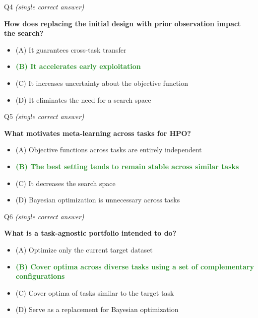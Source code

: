 \documentclass[main]{subfiles}
\newcommand{\correct}[1]{\textcolor{ForestGreen}{\textbf{#1} \checkmark}}
\newcommand{\wrong}[1]{#1}
\begin{document}
\begin{frame}{Q4 \hfill \small\normalfont\textit{(single correct answer)}}

\textbf{How does replacing the initial design with prior observation impact the search?}

\begin{itemize}
    \item \wrong{(A) \; It guarantees cross-task transfer}
    \item \correct{(B) \; It accelerates early exploitation}
    \item \wrong{(C) \; It increases uncertainty about the objective function}
    \item \wrong{(D) \; It eliminates the need for a search space}
\end{itemize}

\end{frame}
\begin{frame}{Q5 \hfill \small\normalfont\textit{(single correct answer)}}

\textbf{What motivates meta-learning across tasks for HPO?}

\begin{itemize}
    \item \wrong{(A) \; Objective functions across tasks are entirely independent}
    \item \correct{(B) \; The best setting tends to remain stable across similar tasks}
    \item \wrong{(C) \; It decreases the search space}
    \item \wrong{(D) \; Bayesian optimization is unnecessary across tasks}
\end{itemize}

\end{frame}
\begin{frame}{Q6 \hfill \small\normalfont\textit{(single correct answer)}}

\textbf{What is a task-agnostic portfolio intended to do?}

\begin{itemize}
    \item \wrong{(A) \; Optimize only the current target dataset}
    \item \correct{(B) \; Cover optima across diverse tasks using a set of complementary configurations}
    \item \wrong{(C) \; Cover optima of tasks similar to the target task}
    \item \wrong{(D) \; Serve as a replacement for Bayesian optimization}
\end{itemize}

\end{frame}
\end{document}
